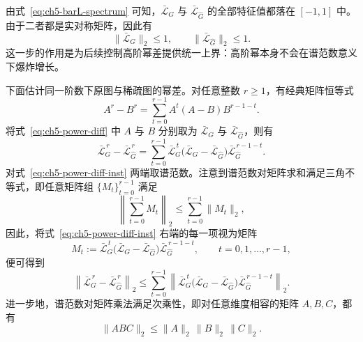 由式~\eqref{eq:ch5-barL-spectrum} 可知，$\bar{\mathcal{L}}_G$ 与 $\bar{\mathcal{L}}_{\hat G}$ 的全部特征值都落在 $[-1,1]$ 中。由于二者都是实对称矩阵，因此有
\begin{equation}
  \|\bar{\mathcal{L}}_G\|_2\le 1,
  \qquad
  \|\bar{\mathcal{L}}_{\hat G}\|_2\le 1.
  \label{eq:ch5-barL-norm}
\end{equation}
这一步的作用是为后续控制高阶幂差提供统一上界：高阶幂本身不会在谱范数意义下爆炸增长。

下面估计同一阶数下原图与稀疏图的幂差。对任意整数 $r\ge 1$，有经典矩阵恒等式\cite{HornJohnson2012}
\begin{equation}
  A^r-B^r
  =
  \sum_{t=0}^{r-1}A^t(A-B)B^{r-1-t}.
  \label{eq:ch5-power-diff}
\end{equation}
将式~\eqref{eq:ch5-power-diff} 中 $A$ 与 $B$ 分别取为 $\bar{\mathcal{L}}_G$ 与 $\bar{\mathcal{L}}_{\hat G}$，则有
\begin{equation}
  \bar{\mathcal{L}}_G^{\,r}-\bar{\mathcal{L}}_{\hat G}^{\,r}
  =
  \sum_{t=0}^{r-1}
  \bar{\mathcal{L}}_G^{\,t}
  \bigl(\bar{\mathcal{L}}_G-\bar{\mathcal{L}}_{\hat G}\bigr)
  \bar{\mathcal{L}}_{\hat G}^{\,r-1-t}.
  \label{eq:ch5-power-diff-inst}
\end{equation}
对式~\eqref{eq:ch5-power-diff-inst} 两端取谱范数。注意到谱范数对矩阵求和满足三角不等式，即任意矩阵组 $\{M_t\}_{t=0}^{r-1}$ 满足
\begin{equation}
  \left\|
  \sum_{t=0}^{r-1} M_t
  \right\|_2
  \le
  \sum_{t=0}^{r-1}\|M_t\|_2,
  \label{eq:ch5-triangle-ineq}
\end{equation}
因此，将式~\eqref{eq:ch5-power-diff-inst} 右端的每一项视为矩阵
\begin{equation}
  M_t
  :=
  \bar{\mathcal{L}}_G^{\,t}
  \bigl(\bar{\mathcal{L}}_G-\bar{\mathcal{L}}_{\hat G}\bigr)
  \bar{\mathcal{L}}_{\hat G}^{\,r-1-t},
  \qquad t=0,1,\ldots,r-1,
  \label{eq:ch5-Mt-def}
\end{equation}
便可得到
\begin{equation}
  \left\|
  \bar{\mathcal{L}}_G^{\,r}-\bar{\mathcal{L}}_{\hat G}^{\,r}
  \right\|_2
  \le
  \sum_{t=0}^{r-1}
  \left\|
  \bar{\mathcal{L}}_G^{\,t}
  \bigl(\bar{\mathcal{L}}_G-\bar{\mathcal{L}}_{\hat G}\bigr)
  \bar{\mathcal{L}}_{\hat G}^{\,r-1-t}
  \right\|_2 .
  \label{eq:ch5-power-diff-step1}
\end{equation}
进一步地，谱范数对矩阵乘法满足次乘性，即对任意维度相容的矩阵 $A,B,C$，都有
\begin{equation}
  \|ABC\|_2
  \le
  \|A\|_2\,\|B\|_2\,\|C\|_2.
  \label{eq:ch5-submultiplicative-abc}
\end{equation}
